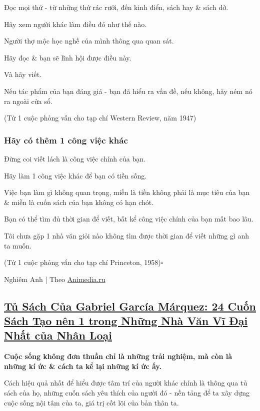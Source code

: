 \documentclass{article}
\begin{document}
Đọc mọi thứ - từ những thứ rác rưởi, đến kinh điển, sách hay \& sách dở.

Hãy xem người khác làm điều đó như thế nào.

Người thợ mộc học nghề của mình thông qua quan sát.

Hãy đọc \& bạn sẽ lĩnh hội được điều này.

Và hãy viết.

Nếu tác phẩm của bạn đáng giá - bạn đã hiểu ra vấn đề, nếu không, hãy ném nó ra ngoài cửa sổ.

(Từ 1 cuộc phỏng vấn cho tạp chí Western Review, năm 1947)

\subsubsection{Hãy có thêm 1 công việc khác}
Đừng coi viết lách là công việc chính của bạn.

Hãy làm 1 công việc khác để bạn có tiền sống.

Việc bạn làm gì không quan trọng, miễn là tiền không phải là mục tiêu của bạn \& miễn là cuốn sách của bạn không có hạn chót.

Bạn có thể tìm đủ thời gian để viết, bất kể công việc chính của bạn mất bao lâu.

Tôi chưa gặp 1 nhà văn giỏi nào không tìm được thời gian để viết những gì anh ta muốn.

(Từ 1 cuộc phỏng vấn cho tạp chí Princeton, 1958)\hfill$\square$

\begin{flushright}
	Nghiêm Anh | Theo \url{Animedia.ru}
\end{flushright}


\subsection{\href{http://tramdoc.vn/tin-tuc/tu-sach-cua-gabriel-garcia-marquez-24-cuon-sach-tao-nen-mot-trong-nhung-nha-van-vi-dai-nhat-cua-nhan-loai-nnOn1W.html}{Tủ Sách Của Gabriel García Márquez: 24 Cuốn Sách Tạo nên 1 trong Những Nhà Văn Vĩ Đại Nhất của Nhân Loại}}

\textbf{Cuộc sống không đơn thuần chỉ là những trải nghiệm, mà còn là những kí ức \& cách ta kể lại những kí ức ấy.}

%
Cách hiệu quả nhất để hiểu được tâm trí của người khác chính là thông qua tủ sách của họ, những cuốn sách yêu thích của người đó - nền tảng để ta xây dựng cuộc sống nội tâm của ta, giá trị cốt lõi của bản thân ta.
\end{document}
